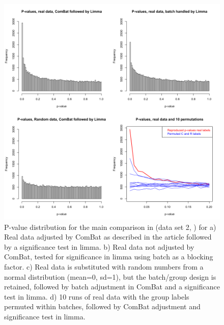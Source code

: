 \documentclass{bio}
\begin{document}
\begin{figure}[!p]
\centering\includegraphics[width=13cm]{Fig/pvaluesjohnson.png}
\caption{
P-value distribution for the main comparison in (data set 2, \citealp{Johnson2007}) for  
a) Real data adjusted by ComBat as described in the article followed by a significance test in limma. 
b) Real data not adjusted by ComBat, tested for significance in limma using batch as a blocking factor. 
c) Real data is substituted with random numbers from a normal distribution (mean=0, sd=1), but the batch/group design is retained, followed by batch adjustment in ComBat and a significance test in limma.
d) 10 runs of real data with the group labels permuted within batches, followed by ComBat adjustment and significance test in limma.   
}
\label{fig:p-johnson}
\end{figure}
\end{document}
